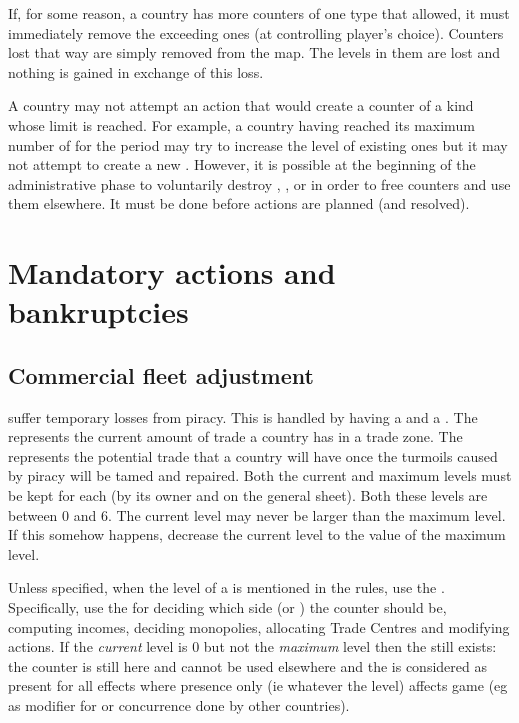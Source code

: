 \aparag If, for some reason, a country has more counters of one type that
allowed, it must immediately remove the exceeding ones (at controlling
player's choice).
\bparag Counters lost that way are simply removed from the map. The levels in
them are lost and nothing is gained in exchange of this loss.

\aparag A country may not attempt an action that would create a counter of a
kind whose limit is reached. For example, a country having reached its maximum
number of \COL for the period may try to increase the level of existing ones
but it may not attempt to create a new \COL.
\bparag However, it is possible at the beginning of the administrative phase
to voluntarily destroy \COL, \TP, \MNU or \TradeFLEET in order to free
counters and use them elsewhere. It must be done before actions are planned
(and resolved).




\section{Mandatory actions and bankruptcies}\label{chAdministration:Mandatory}



\subsection{Commercial fleet adjustment}\label{chAdministration:Commercial Fleet
  Adjustment}

 \TradeFLEET suffer temporary losses from
piracy. This is handled by having a  and a .
\bparag The  represents the current amount of trade a
country has in a trade zone.
\bparag The  represents the potential trade that a
country will have once the turmoils caused by piracy will be tamed and
repaired.
\bparag Both the current and maximum levels must be kept for each \TradeFLEET
(by its owner and on the general \TradeFLEET sheet).
\bparag Both these levels are between 0 and 6.
\bparag The current level may never be larger than the maximum level. If this
somehow happens, decrease the current level to the value of the maximum level.

 Unless specified, when the level of a \TradeFLEET is
mentioned in the rules, use the .
\bparag Specifically, use the  for deciding which side
(\Facemoins or \Faceplus) the counter should be, computing incomes, deciding
monopolies, allocating Trade Centres and modifying \TFI actions.
\bparag If the \emph{current} level is 0 but not the \emph{maximum} level then
the \TradeFLEET still exists: the counter is still here and cannot be used
elsewhere and the \TradeFLEET is considered as present for all effects where
presence only (ie whatever the level) affects game (eg as modifier for \TFI or
concurrence done by other countries).


